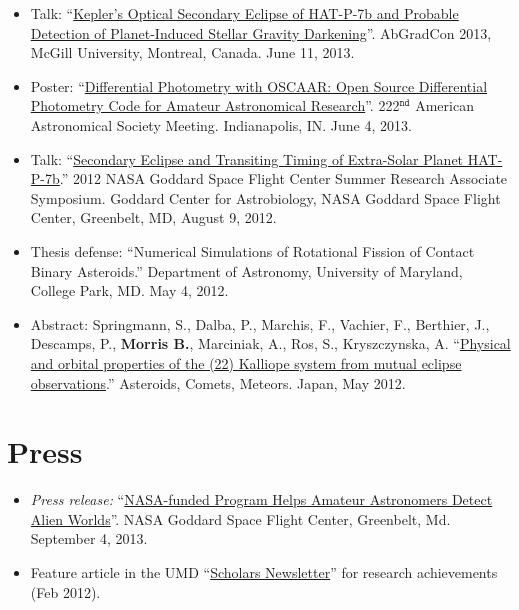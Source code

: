 \documentclass[margin]{res}
\begin{document}
\begin{resume}
\begin{itemize}
\item Talk: ``\href{http://youtu.be/ZMfbkCzzQUE}{Kepler's Optical Secondary Eclipse of HAT-P-7b and Probable Detection of Planet-Induced Stellar Gravity Darkening}''. AbGradCon 2013, McGill University, Montreal, Canada. June 11, 2013.

\item Poster: ``\href{http://adsabs.harvard.edu/abs/2013AAS...22221717M}{Differential Photometry with OSCAAR: Open Source Differential Photometry Code for Amateur Astronomical Research}''. 222$^\mathtt{nd}$ American Astronomical Society Meeting. Indianapolis, IN. June 4, 2013.

\item Talk: ``\href{https://astrobiology.nasa.gov/seminars/featured-seminar-channels/gsfc-summer-internship/2012/08/09/gsfc-summer-research-associate-presentations/}{Secondary Eclipse and Transiting Timing of Extra-Solar Planet HAT-P-7b}.'' 2012 NASA Goddard Space Flight Center Summer Research Associate Symposium. Goddard Center for Astrobiology, NASA Goddard Space Flight Center, Greenbelt, MD, August 9, 2012.

\item Thesis defense:  ``Numerical Simulations of Rotational Fission of Contact Binary Asteroids.'' Department of Astronomy, University of Maryland, College Park, MD. May 4, 2012.

\item Abstract: Springmann, S., Dalba, P., Marchis, F., Vachier, F., Berthier, J., Descamps, P., \textbf{Morris B.}, Marciniak, A., Ros, S., Kryszczynska, A. ``\href{http://adsabs.harvard.edu/abs/2012LPICo1667.6352S}{Physical and orbital properties of the (22) Kalliope system from mutual eclipse observations}.'' Asteroids, Comets, Meteors. Japan, May 2012.\\
\end{itemize}



\section{Press} 
\begin{itemize}
\item {\it Press release:} ``\href{http://www.nasa.gov/content/nasa-funded-program-helps-amateur-astronomers-detect-alien-worlds/}{NASA-funded Program Helps Amateur Astronomers Detect Alien Worlds}''. NASA Goddard Space Flight Center, Greenbelt, Md. September 4, 2013.

\item Feature article in the UMD ``\href{http://www.scholars.umd.edu/news/newsletter/363-february-2012-issue-1}{Scholars Newsletter}'' for research achievements (Feb 2012).\\
\end{itemize}              



\end{resume}
\end{document}

